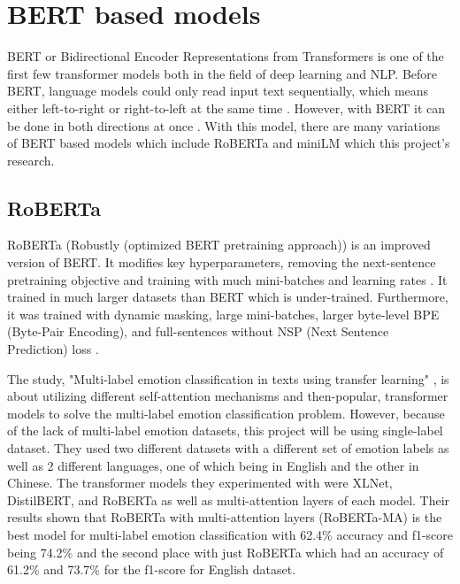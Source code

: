 \section{BERT based models}
BERT or Bidirectional Encoder Representations from Transformers is one of the first few transformer models both in the field of deep learning and NLP.
Before BERT, language models could only read input text sequentially, which means either left-to-right or right-to-left at the same time \cite{Hashemi-Pour_Lutkevich_2024}.
However, with BERT it can be done in both directions at once \cite{Hashemi-Pour_Lutkevich_2024}.
With this model, there are many variations of BERT based models which include RoBERTa and miniLM which this project's research. 

\subsection{RoBERTa}
RoBERTa (Robustly (optimized BERT pretraining approach)) is an improved version of BERT.
It modifies key hyperparameters, removing the next-sentence pretraining objective and training with much mini-batches and learning rates \cite{Sharma_2022}.
It trained in much larger datasets than BERT which is under-trained. 
Furthermore, it was trained with dynamic masking, large mini-batches, larger byte-level BPE (Byte-Pair Encoding), and full-sentences without NSP (Next Sentence Prediction) loss \cite{Sharma_2022}.

The study, "Multi-label emotion classification in texts using transfer learning" \cite{AMEER2023118534}, is about utilizing different self-attention mechanisms and then-popular, transformer models to solve the multi-label emotion classification problem.
However, because of the lack of multi-label emotion datasets, this project will be using single-label dataset.
They used two different datasets with a different set of emotion labels as well as 2 different languages, one of which being in English and the other in Chinese.
The transformer models they experimented with were XLNet, DistilBERT, and RoBERTa as well as multi-attention layers of each model.
Their results shown that RoBERTa with multi-attention layers (RoBERTa-MA) is the best model for multi-label emotion classification with 62.4\% accuracy and f1-score being 74.2\% and the second place with just RoBERTa which had an accuracy of 61.2\% and 73.7\% for the f1-score for English dataset. 

